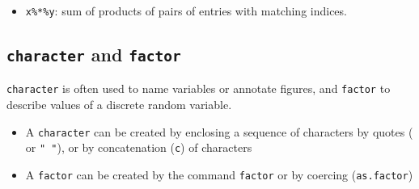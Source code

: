 \documentclass[]{article}
\newenvironment{Shaded}{\begin{snugshade}}{\end{snugshade}}
\newcommand{\KeywordTok}[1]{\textcolor[rgb]{0.13,0.29,0.53}{\textbf{{#1}}}}
\newcommand{\DecValTok}[1]{\textcolor[rgb]{0.00,0.00,0.81}{{#1}}}
\newcommand{\StringTok}[1]{\textcolor[rgb]{0.31,0.60,0.02}{{#1}}}
\newcommand{\CommentTok}[1]{\textcolor[rgb]{0.56,0.35,0.01}{\textit{{#1}}}}
\newcommand{\ErrorTok}[1]{\textcolor[rgb]{0.64,0.00,0.00}{\textbf{{#1}}}}
\newcommand{\NormalTok}[1]{{#1}}
\providecommand{\tightlist}{%
  \setlength{\itemsep}{0pt}\setlength{\parskip}{0pt}}
\begin{document}
\begin{Shaded}
\end{Shaded}

\begin{itemize}
\tightlist
\item
  \texttt{x\%*\%y}: sum of products of pairs of entries with matching
  indices.
\end{itemize}

\subsection{\texorpdfstring{\texttt{character} and
\texttt{factor}}{character and factor}}\label{character-and-factor}

\texttt{character} is often used to name variables or annotate figures,
and \texttt{factor} to describe values of a discrete random variable.

\begin{itemize}
\tightlist
\item
  A \texttt{character} can be created by enclosing a sequence of
  characters by quotes (\texttt{\textquotesingle{}\textquotesingle{}} or
  \texttt{"\ "}), or by concatenation (\texttt{c}) of characters
\item
  A \texttt{factor} can be created by the command \texttt{factor} or by
  coercing (\texttt{as.factor})
\end{itemize}
\end{document}
